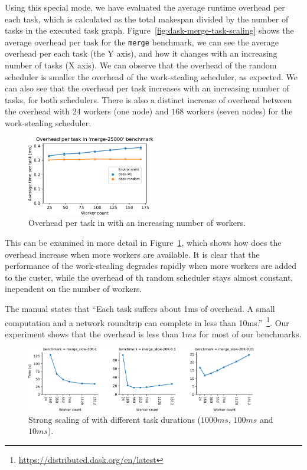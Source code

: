 Using this special mode, we have evaluated the average runtime overhead per each task, which is
calculated as the total makespan divided by the number of tasks in the executed task graph.
Figure~\ref{fig:dask-merge-task-scaling} shows the average overhead per task for the
\texttt{merge} benchmark, we can see the average overhead per each task (the Y axis),
and how it changes with an increasing number of tasks (X axis). We can observe that the overhead of
the random scheduler is smaller the overhead of the work-stealing scheduler, as expected. We can
also see that the overhead per task increases with an increasing number of tasks, for both
schedulers. There is also a distinct increase of overhead between the overhead with
$24$ workers (one node) and $168$ workers (seven nodes)
for the work-stealing scheduler.

\begin{figure}
	\centering
	\includegraphics[width=0.5\textwidth]{imgs/rsds/charts/dask-merge-worker-scaling}
	\caption{Overhead per task in \dask{} with an increasing number of workers.}
	\label{fig:dask-merge-worker-scaling}
\end{figure}

This can be examined in more detail in Figure~\ref{fig:dask-merge-worker-scaling}, which shows how does the
overhead increase when more workers are available. It is clear that the performance of the
work-stealing degrades rapidly when more workers are added to the custer, while the overhead of th
random scheduler stays almost constant, inependent on the number of workers.

The \dask{} manual states that ``Each task suffers about 1ms of overhead. A
small computation and a network roundtrip can complete in less than
10ms.''~\footnote{\url{https://distributed.dask.org/en/latest}}. Our experiment shows that the overhead is less than
$1ms$ for most of our benchmarks.

\begin{figure}
	\centering
	\includegraphics[width=0.9\textwidth]{imgs/rsds/charts/dask-strong-scaling}
	\caption{Strong scaling of \dask{} with different task durations
	($1000ms$, $100ms$ and
	$10ms$).}
	\label{fig:dask-strong-scaling}
\end{figure}

